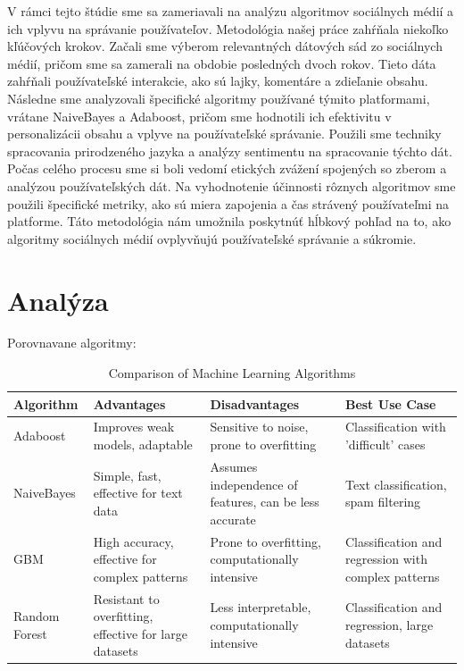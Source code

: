 \documentclass[12pt,twoside,slovak,a4paper]{article}
\begin{document}
V rámci tejto štúdie sme sa zameriavali na analýzu algoritmov sociálnych médií a ich vplyvu na správanie používateľov. Metodológia našej práce zahŕňala niekoľko kľúčových krokov. Začali sme výberom relevantných dátových sád zo sociálnych médií, pričom sme sa zamerali na obdobie posledných dvoch rokov. Tieto dáta zahŕňali používateľské interakcie, ako sú lajky, komentáre a zdieľanie obsahu. Následne sme analyzovali špecifické algoritmy používané týmito platformami, vrátane NaiveBayes a Adaboost, pričom sme hodnotili ich efektivitu v personalizácii obsahu a vplyve na používateľské správanie. Použili sme techniky spracovania prirodzeného jazyka a analýzy sentimentu na spracovanie týchto dát. Počas celého procesu sme si boli vedomí etických zvážení spojených so zberom a analýzou používateľských dát. Na vyhodnotenie účinnosti rôznych algoritmov sme použili špecifické metriky, ako sú miera zapojenia a čas strávený používateľmi na platforme. Táto metodológia nám umožnila poskytnúť hĺbkový pohľad na to, ako algoritmy sociálnych médií ovplyvňujú používateľské správanie a súkromie.


\section{Analýza}
Porovnavane algoritmy:

\begin{table}[h]
\centering
\begin{tabular}{|l|p{4cm}|p{4cm}|p{3cm}|}
\hline
\textbf{Algorithm} & \textbf{Advantages} & \textbf{Disadvantages} & \textbf{Best Use Case} \\
\hline
Adaboost & Improves weak models, adaptable & Sensitive to noise, prone to overfitting & Classification with 'difficult' cases \\
\hline
NaiveBayes & Simple, fast, effective for text data & Assumes independence of features, can be less accurate & Text classification, spam filtering \\
\hline
GBM & High accuracy, effective for complex patterns & Prone to overfitting, computationally intensive & Classification and regression with complex patterns \\
\hline
Random Forest & Resistant to overfitting, effective for large datasets & Less interpretable, computationally intensive & Classification and regression, large datasets \\
\hline
\end{tabular}
\caption{Comparison of Machine Learning Algorithms}
\label{table:algorithm_comparison}
\end{table}
\end{document}
